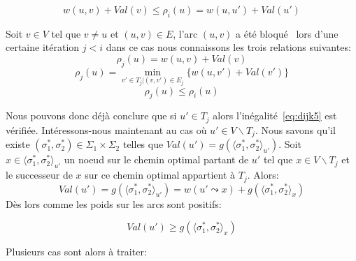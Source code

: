 \begin{enumerate}
\begin{equation}
	\label{eq:dijk5}
	w(u,v) + Val(v) \leq \rho_i(u) = w(u,u') + Val(u') 
\end{equation}

Soit $v \in V$ tel que $v \neq u$ et $(u,v) \in E$, l'arc $(u,v)$ a été \og bloqué \fg~lors d'une certaine itération $j < i $ dans ce cas nous connaissons les trois relations suivantes:
\begin{equation} \label{eq:dijk6}
	  \rho_j(u) = w(u,v) + Val(v) 
	\end{equation}
\begin{equation*}  \rho_j(u) = \min_{v' \in T_j |(v,v') \in E_j} \{ w(u,v') + Val(v') \} \end{equation*}
\begin{equation*} \rho_j(u) \leq \rho_i(u) \end{equation*}
	
Nous pouvons donc déjà conclure que si $u' \in T_j$ alors l'inégalité~\eqref{eq:dijk5} est vérifiée.
Intéressons-nous maintenant au cas où $u' \in V \backslash T_j$. Nous savons qu'il existe $(\sigma_1^*, \sigma_2^*) \in \Sigma_1 \times \Sigma_2$ telles que $Val(u') = g( \langle \sigma_1^*, \sigma_2^* \rangle_{u'})$. 
Soit $x \in \langle \sigma_1^*, \sigma_2^* \rangle_{u'}$ un noeud sur le chemin optimal partant de $u'$ tel que $x \in V\backslash T_j$ et le successeur de $x$ sur ce chemin optimal appartient à $T_j$.
Alors:
$$ Val(u') = g( \langle \sigma_1^*, \sigma_2^* \rangle_{u'}) = w(u' \leadsto x) + g( \langle \sigma_1^*, \sigma_2^* \rangle_{x}) $$
Dès lors comme les poids sur les arcs sont positifs:

\begin{equation*}
	Val(u') \geq g( \langle \sigma_1^*, \sigma_2^* \rangle_{x})
\end{equation*}

Plusieurs cas sont alors à traiter:


\end{enumerate}
